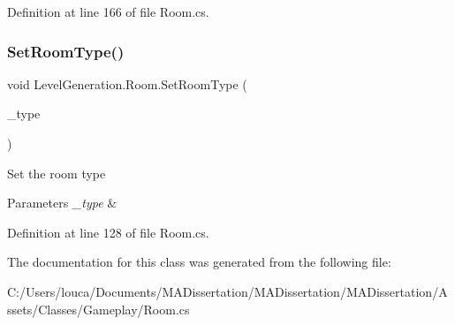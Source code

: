 Definition at line 166 of file Room.\+cs.

\mbox{\label{class_level_generation_1_1_room_ac4d1b1b285ac602653b1810eb09492fd}} 
\subsubsection{\texorpdfstring{Set\+Room\+Type()}{SetRoomType()}}
{\footnotesize\ttfamily void Level\+Generation.\+Room.\+Set\+Room\+Type (\begin{DoxyParamCaption}\item[{\mbox{\hyperlink{namespace_level_generation_a206451e0c8bfced86ae4b9348cd3718f}{Room\+Type}}}]{\+\_\+type }\end{DoxyParamCaption})}



Set the room type 


\begin{DoxyParams}{Parameters}
{\em \+\_\+type} & \\
\hline
\end{DoxyParams}


Definition at line 128 of file Room.\+cs.



The documentation for this class was generated from the following file\+:\begin{DoxyCompactItemize}
\item 
C\+:/\+Users/louca/\+Documents/\+M\+A\+Dissertation/\+M\+A\+Dissertation/\+M\+A\+Dissertation/\+Assets/\+Classes/\+Gameplay/Room.\+cs\end{DoxyCompactItemize}
